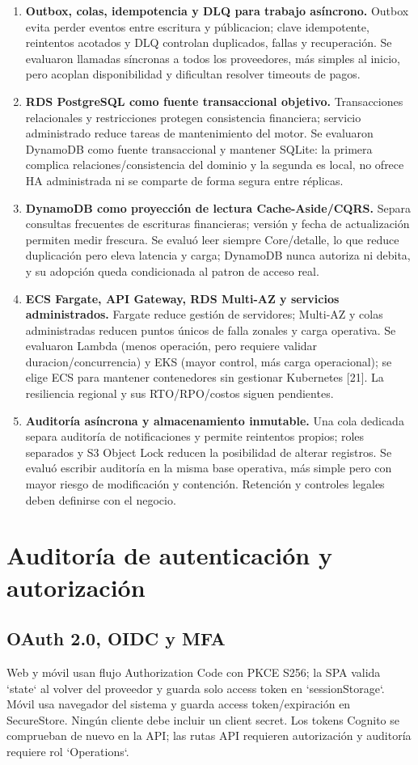 \documentclass[11pt,a4paper]{report}
\begin{document}
\begin{enumerate}
\item \textbf{Outbox, colas, idempotencia y DLQ para trabajo asíncrono.} Outbox evita perder eventos entre escritura y públicacion; clave idempotente, reintentos acotados y DLQ controlan duplicados, fallas y recuperación. Se evaluaron llamadas síncronas a todos los proveedores, más simples al inicio, pero acoplan disponibilidad y dificultan resolver timeouts de pagos.
\item \textbf{RDS PostgreSQL como fuente transaccional objetivo.} Transacciones relacionales y restricciones protegen consistencia financiera; servicio administrado reduce tareas de mantenimiento del motor. Se evaluaron DynamoDB como fuente transaccional y mantener SQLite: la primera complica relaciones/consistencia del dominio y la segunda es local, no ofrece HA administrada ni se comparte de forma segura entre réplicas.
\item \textbf{DynamoDB como proyección de lectura Cache-Aside/CQRS.} Separa consultas frecuentes de escrituras financieras; versión y fecha de actualización permiten medir frescura. Se evaluó leer siempre Core/detalle, lo que reduce duplicación pero eleva latencia y carga; DynamoDB nunca autoriza ni debita, y su adopción queda condicionada al patron de acceso real.
\item \textbf{ECS Fargate, API Gateway, RDS Multi-AZ y servicios administrados.} Fargate reduce gestión de servidores; Multi-AZ y colas administradas reducen puntos únicos de falla zonales y carga operativa. Se evaluaron Lambda (menos operación, pero requiere validar duracion/concurrencia) y EKS (mayor control, más carga operacional); se elige ECS para mantener contenedores sin gestionar Kubernetes [21]. La resiliencia regional y sus RTO/RPO/costos siguen pendientes.
\item \textbf{Auditoría asíncrona y almacenamiento inmutable.} Una cola dedicada separa auditoría de notificaciones y permite reintentos propios; roles separados y S3 Object Lock reducen la posibilidad de alterar registros. Se evaluó escribir auditoría en la misma base operativa, más simple pero con mayor riesgo de modificación y contención. Retención y controles legales deben definirse con el negocio.
\end{enumerate}

\chapter{Auditoría de autenticación y autorización}
\section{OAuth 2.0, OIDC y MFA}
Web y móvil usan flujo Authorization Code con PKCE S256; la SPA valida `state` al volver del proveedor y guarda solo access token en `sessionStorage`. Móvil usa navegador del sistema y guarda access token/expiración en SecureStore. Ningún cliente debe incluir un client secret. Los tokens Cognito se comprueban de nuevo en la API; las rutas API requieren autorización y auditoría requiere rol `Operations`.
\end{document}
